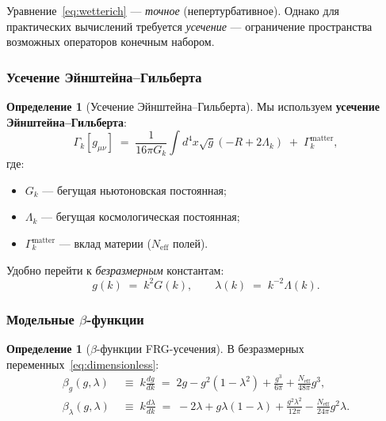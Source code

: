 \documentclass[11pt,a4paper]{article}
\theoremstyle{definition}
\newtheorem{definition}[theorem]{Определение}
\begin{document}
\medskip\noindent
Уравнение~\eqref{eq:wetterich} --- \emph{точное}
(непертурбативное). Однако для практических вычислений
требуется \emph{усечение} --- ограничение пространства
возможных операторов конечным набором.

\subsubsection{Усечение Эйнштейна--Гильберта}

\begin{definition}[Усечение Эйнштейна--Гильберта]
\label{def:eh-truncation}
Мы используем \textbf{усечение Эйнштейна--Гильберта}:
\begin{equation}
    \Gamma_k[g_{\mu\nu}]
    \;=\; \frac{1}{16\pi G_k} \int d^4 x \sqrt{g}
    \left(-R + 2\Lambda_k\right)
    \;+\; \Gamma_k^{\text{matter}},
    \label{eq:eh-truncation}
\end{equation}
где:
\begin{itemize}
    \item $G_k$ --- бегущая ньютоновская постоянная;
    \item $\Lambda_k$ --- бегущая космологическая постоянная;
    \item $\Gamma_k^{\text{matter}}$ --- вклад материи
          ($N_{\text{eff}}$ полей).
\end{itemize}
\end{definition}

\medskip\noindent
Удобно перейти к \emph{безразмерным} константам:
\begin{equation}
    g(k) \;=\; k^2 G(k), \qquad
    \lambda(k) \;=\; k^{-2} \Lambda(k).
    \label{eq:dimensionless}
\end{equation}

\subsubsection{Модельные \texorpdfstring{$\beta$}{}-функции}

\begin{definition}[$\beta$-функции FRG-усечения]
\label{def:frg-beta}
В безразмерных переменных~\eqref{eq:dimensionless}:
\begin{align}
    \beta_g(g, \lambda) &\;\equiv\; k \frac{dg}{dk}
    \;=\; 2g - g^2(1-\lambda^2) + \frac{g^3}{6\pi}
    + \frac{N_{\text{eff}}}{48\pi} g^3,
    \label{eq:beta-g-full} \\[0.5em]
    \beta_\lambda(g, \lambda) &\;\equiv\; k \frac{d\lambda}{dk}
    \;=\; -2\lambda + g\lambda(1-\lambda)
    + \frac{g^2 \lambda^2}{12\pi}
    - \frac{N_{\text{eff}}}{24\pi} g^2 \lambda.
    \label{eq:beta-lambda-full}
\end{align}
\end{definition}
\end{document}
